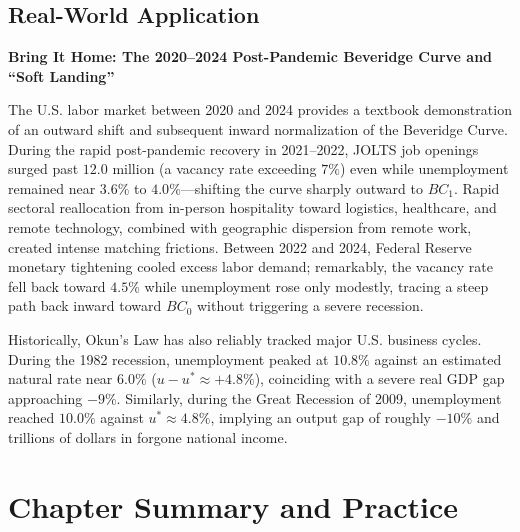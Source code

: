 \documentclass[11pt, a4paper]{article}
\newcommand{\boxheader}[2]{\textbf{\textcolor{#1}{#2}}\par\smallskip}
\begin{document}
\subsection*{Real-World Application}
\begin{examplecase}
\boxheader{CourseBlue}{Bring It Home: The 2020--2024 Post-Pandemic Beveridge Curve and ``Soft Landing''}
The U.S. labor market between 2020 and 2024 provides a textbook demonstration of an outward shift and subsequent inward normalization of the Beveridge Curve. During the rapid post-pandemic recovery in 2021--2022, JOLTS job openings surged past $12.0\text{ million}$ (a vacancy rate exceeding $7\%$) even while unemployment remained near $3.6\%$ to $4.0\%$—shifting the curve sharply outward to $BC_1$. Rapid sectoral reallocation from in-person hospitality toward logistics, healthcare, and remote technology, combined with geographic dispersion from remote work, created intense matching frictions. Between 2022 and 2024, Federal Reserve monetary tightening cooled excess labor demand; remarkably, the vacancy rate fell back toward $4.5\%$ while unemployment rose only modestly, tracing a steep path back inward toward $BC_0$ without triggering a severe recession.
\end{examplecase}

Historically, Okun's Law has also reliably tracked major U.S. business cycles. During the 1982 recession, unemployment peaked at $10.8\%$ against an estimated natural rate near $6.0\%$ ($u - u^* \approx +4.8\%$), coinciding with a severe real GDP gap approaching $-9\%$. Similarly, during the Great Recession of 2009, unemployment reached $10.0\%$ against $u^* \approx 4.8\%$, implying an output gap of roughly $-10\%$ and trillions of dollars in forgone national income.

\section*{Chapter Summary and Practice}
\end{document}
